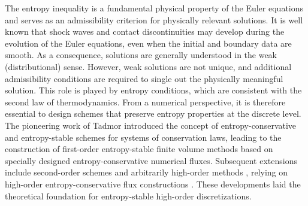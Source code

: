 \documentclass[fleqn,11pt]{amsart}
\begin{document}

The entropy inequality is a fundamental physical property of the Euler equations and serves as an admissibility criterion for physically relevant solutions. It is well known that shock waves and contact discontinuities may develop during the evolution of the Euler equations, even when the initial and boundary data are smooth. As a consequence, solutions are generally understood in the weak
(distributional) sense. However, weak solutions are not unique, and additional admissibility conditions are required to single out the physically meaningful solution.
This role is played by entropy conditions, which are consistent with the second law of thermodynamics.
From a numerical perspective, it is therefore essential to design schemes that preserve entropy properties at the discrete level. The pioneering work of Tadmor \cite{tadmor1987numerical} introduced the concept of entropy-conservative and entropy-stable schemes for systems of conservation laws, leading to the construction of first-order entropy-stable finite volume methods based on specially designed entropy-conservative numerical fluxes. Subsequent extensions include second-order schemes \cite{tadmor2003entropy} and arbitrarily high-order methods \cite{fjordholm2012arbitrarily}, relying on
high-order entropy-conservative flux constructions
\cite{lefloch2002fully}. These developments laid the theoretical foundation for entropy-stable
high-order discretizations.
\end{document}
